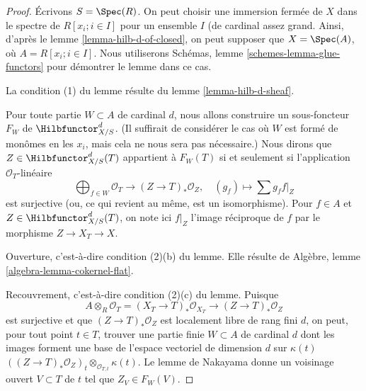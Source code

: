 \begin{proof}
Écrivons $S = \Spec(R)$. On peut choisir une immersion fermée de $X$
dans le spectre de $R[x_i; i \in I]$ pour un ensemble $I$ (de cardinal
assez grand. Ainsi, d'après le lemme \ref{lemma-hilb-d-of-closed},
on peut supposer que $X = \Spec(A)$, où $A = R[x_i; i \in I]$.
Nous utiliserons Schémas, lemme \ref{schemes-lemma-glue-functors} pour démontrer le
lemme dans ce cas.

\medskip\noindent
La condition (1) du lemme résulte du lemme \ref{lemma-hilb-d-sheaf}.

\medskip\noindent
Pour toute partie $W \subset A$ de cardinal $d$, nous allons
construire un sous-foncteur $F_W$ de $\Hilbfunctor^d_{X/S}$.
(Il suffirait de considérer le cas où $W$ est formé de
monômes en les $x_i$, mais cela ne nous sera pas nécessaire.)
Nous dirons que $Z \in \Hilbfunctor^d_{X/S}(T)$ appartient à $F_W(T)$
si et seulement si l'application $\mathcal{O}_T$-linéaire
$$
\bigoplus\nolimits_{f \in W} \mathcal{O}_T
\longrightarrow
(Z \to T)_*\mathcal{O}_Z,\quad
(g_f) \longmapsto \sum g_f f|_Z
$$
est surjective (ou, ce qui revient au même, est un isomorphisme). Pour $f \in A$
et $Z \in \Hilbfunctor^d_{X/S}(T)$, on note ici $f|_Z$ l'image réciproque de $f$
par le morphisme $Z \to X_T \to X$.

\medskip\noindent
Ouverture, c'est-à-dire condition (2)(b) du lemme. Elle résulte de
Algèbre, lemme \ref{algebra-lemma-cokernel-flat}.

\medskip\noindent
Recouvrement, c'est-à-dire condition (2)(c) du lemme. Puisque
$$
A \otimes_R \mathcal{O}_T =
(X_T \to T)_*\mathcal{O}_{X_T} \to (Z \to T)_*\mathcal{O}_Z
$$
est surjective et que $(Z \to T)_*\mathcal{O}_Z$ est localement libre
de rang fini $d$, on peut, pour tout point $t \in T$, trouver une partie finie
$W \subset A$ de cardinal $d$ dont les images forment une base
de l'espace vectoriel de dimension $d$ sur $\kappa(t)$
$((Z \to T)_*\mathcal{O}_Z)_t \otimes_{\mathcal{O}_{T, t}} \kappa(t)$.
Le lemme de Nakayama donne un voisinage ouvert $V \subset T$
de $t$ tel que $Z_V \in F_W(V)$.


\end{proof}
